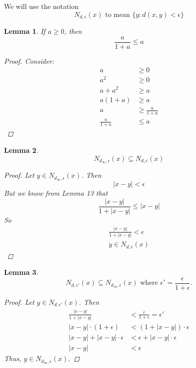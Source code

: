 \documentclass{amsart}
\newtheorem{theorem}{Theorem}
\newtheorem{lemma}[theorem]{Lemma}
\begin{document}
\begin{enumerate}[1.]
We will use the notation
		\[
			N_{d,\epsilon}(x) \text{ to mean } \{ y: d(x, y) < \epsilon\}	
		\]
\begin{lemma}
	If $a \geq 0$, then 
	\[
		\frac{a}{1+a} \leq a
	\]
	\begin{proof}
		Consider:
		\begin{align*}
			a &\geq 0 \\
			a^2 &\geq 0 \\
			a + a^2 &\geq a \\
			a(1 + a) &\geq a \\
			a &\geq \frac{a}{1 + a} \\
			\frac{a}{1 + a} &\leq a
		\end{align*}
	\end{proof}
\end{lemma}
\begin{lemma}
	\[
		N_{d_\infty,\epsilon}(x) \subseteq N_{d,\epsilon}(x)	
	\]
	\begin{proof}
		Let $y \in N_{d_\infty,\epsilon}(x)$. Then
		\[
			|x - y| < \epsilon	
		\]
		But we know from Lemma 13 that
		\[
			\frac{|x - y|}{1 + |x - y|} \leq |x - y|	
		\]
		So
		\begin{align*}
			\frac{|x - y|}{1 + |x - y|} < \epsilon \\
			y \in N_{d,\epsilon}(x)
		\end{align*}
	\end{proof}
\end{lemma}
\begin{lemma}
	\[
		N_{d,\epsilon'}(x) \subseteq N_{d_\infty, \epsilon}(x) \text { where } \epsilon' = \frac{\epsilon}{1 + \epsilon}.	
	\]
	\begin{proof}
		Let $y \in N_{d,\epsilon'}(x)$. Then
		\begin{align*}
			\frac{|x - y|}{1 + |x - y|} &< \frac{\epsilon}{1 + \epsilon} = \epsilon' \\
			|x - y|\cdot(1 + \epsilon) &< (1 + |x - y|)\cdot \epsilon \\
			|x - y| + |x - y|\cdot \epsilon &< \epsilon + |x - y|\cdot \epsilon \\
			|x - y| &< \epsilon
		\end{align*}
		Thus, $y \in N_{d_\infty, \epsilon}(x)$.
	\end{proof}
\end{lemma}
\newpage

\end{enumerate}
\end{document}
